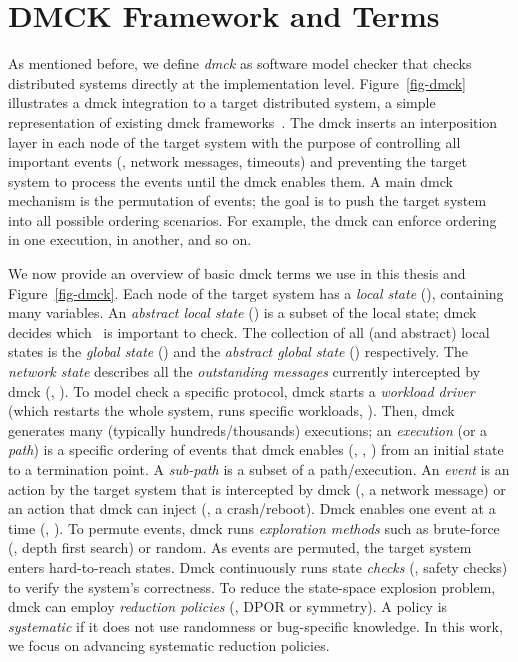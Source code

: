 
\section{DMCK Framework and Terms}
\label{mot-bgterms}




As mentioned before, we define {\em dmck} as  software model checker
that checks distributed systems directly at the implementation level.
Figure~\ref{fig-dmck} illustrates a dmck integration to a target
distributed system, a simple representation of existing dmck
frameworks~\cite{Guo+11-Demeter, Killian+07-LifeDeathMaceMC,
  Simsa+10-Dbug, Yang+09-Modist}.  The dmck inserts an interposition
layer in each node of the target system with the purpose of
controlling all important events (\eg, network messages, timeouts) and
preventing the target system to process the events until the dmck
enables them.  A main dmck mechanism is the permutation of events; the
goal is to push the target system into all possible ordering scenarios.
For example, the dmck can enforce  ordering in one execution,
 in another, and so on.



We now provide an overview of basic dmck terms we use in this thesis
and Figure~\ref{fig-dmck}.
%
Each node of the target system has a {\em local state} (\ls),
containing many variables.  An {\em abstract local state} (\als) is a
subset of the local state; dmck decides which \als\ is important to
check.
%
The collection of all (and abstract) local states is the {\em global
  state} (\gs) and the {\em abstract global state} (\ags)
respectively.  
%
The {\em network state} describes all the {\em outstanding messages}
currently intercepted by dmck (\eg, ).
%
To model check a specific protocol, dmck starts a {\em workload
  driver} (which restarts the whole system, runs specific workloads,
\etc).  Then, dmck generates many (typically hundreds/thousands)
executions; an {\em execution} (or a {\em path}) is a specific
ordering of events that dmck enables (\eg, , ) from
an initial state to a termination point.
%
A {\em sub-path} is a subset of a path/execution.
%
An {\em event} is an action by the target system that is intercepted
by dmck (\eg, a network message) or an action that dmck can inject
(\eg, a crash/reboot).
%
Dmck enables one event at a time (\eg, ).
%
To permute events, dmck runs {\em exploration methods} such as
brute-force (\eg, depth first search) or random.  
%
%
As events are permuted, the target system enters hard-to-reach
states.  Dmck continuously runs state {\em checks} (\eg, safety 
checks) to verify the system's correctness.
%
To reduce the state-space explosion problem, dmck can employ {\em
  reduction policies} (\eg, DPOR or symmetry).  A policy is {\em
  systematic} if it does not use randomness or bug-specific knowledge.
%
In this work, we focus on advancing systematic reduction policies.

